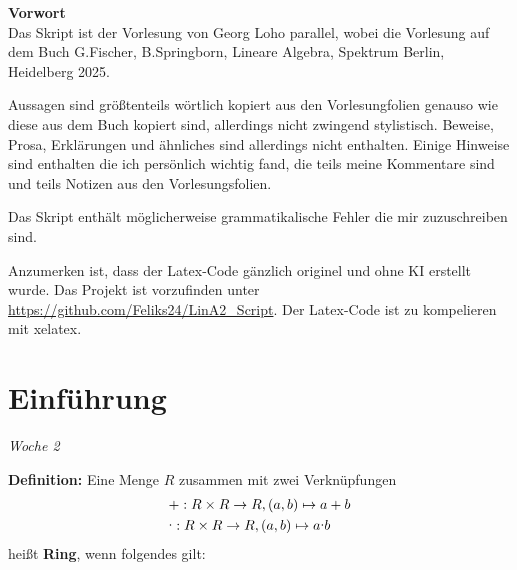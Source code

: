 \documentclass{article}
\let\oldcdot\cdot
\renewcommand{\cdot}{\raisebox{0.1ex}{$\oldcdot$}}
\begin{document}




\newpage




%




\vspace*{2cm}
\begin{center}
\begin{minipage}{0.9\textwidth}
{\large \hspace{2pt}\textbf{Vorwort}\vspace{1pt}}\\

	Das Skript ist der Vorlesung von Georg Loho parallel, wobei die
	Vorlesung auf dem Buch G.Fischer, B.Springborn, Lineare Algebra,
	Spektrum Berlin, Heidelberg 2025. 

	Aussagen sind größtenteils wörtlich kopiert aus den Vorlesungfolien
	genauso wie diese aus dem Buch kopiert sind, allerdings nicht zwingend
	stylistisch. Beweise, Prosa, Erklärungen und ähnliches sind
	allerdings nicht enthalten. Einige Hinweise sind enthalten die ich
	persönlich wichtig fand, die teils meine Kommentare sind und teils
	Notizen aus den Vorlesungsfolien. 

	Das Skript enthält möglicherweise grammatikalische Fehler die mir
	zuzuschreiben sind.

	Anzumerken ist, dass der Latex-Code gänzlich originel und ohne KI
	erstellt wurde. Das Projekt ist vorzufinden unter
	\url{https://github.com/Feliks24/LinA2_Script}. Der Latex-Code ist zu
	kompelieren mit xelatex.

\end{minipage}
\end{center}
\newpage


{
\hypersetup{linkcolor=black}
\tableofcontents
}
\newpage

\section{Einführung}

\textit{\small \hspace{-1.5cm}Woche 2}

\textbf{Definition:} Eine Menge $R$ zusammen mit zwei Verknüpfungen
\begin{align*}
	&+:R\times R\to R, (a,b)\mapsto a+b\\
	&\cdot:R\times R \to R, (a,b)\mapsto a\cdot b
\end{align*}
heißt \textbf{Ring}, wenn folgendes gilt:
\end{document}
